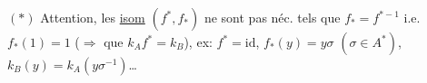 $(*)$ Attention, les \uline{isom} $(f^*,f_*)$ ne sont pas néc. tels que $f_*=f^{*-1}$ i.e. $f_*(1)=1$ ($\Rightarrow$  que $k_Af^*=k_B$), ex: $f^*=\mathrm{id}$, $f_*(y)=y\sigma$ $(\sigma\in A^*)$, $k_B(y)=k_A(y\sigma^{-1})$\ldots
